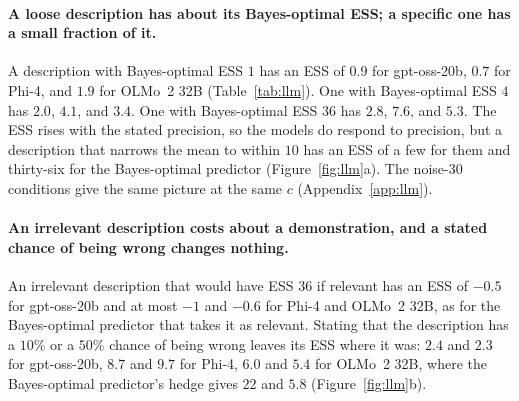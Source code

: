 \documentclass{article}
\begin{document}
\begin{table}[t]
\centering\small
\setlength{\tabcolsep}{2.4pt}
\caption{\textbf{The models rely on the stated value by a fixed amount, so a loose description has about its Bayes-optimal ESS and a specific one a small fraction of it.} Left: ESS of a description for each model against its Bayes-optimal ESS, the median over $n = 1$, $2$, and $4$ demonstrations shown ($\sigma = 60$, $2{,}000$ tasks; brackets, $95\%$ bootstrap intervals; negative: the description costs that many demonstrations; $\le$: one demonstration alone beats the description, so the ESS is at most the value shown), for a relevant description with Bayes-optimal ESS $1$, $4$, or $36$, an irrelevant one that would have ESS $36$, and the description with ESS $36$ with a stated $10\%$ or $50\%$ chance of being wrong. Right: the weight on the stated value with one demonstration shown, for the three relevant descriptions; the Bayes-optimal weight is $c/(c+n)$. The Bayes-optimal row knows only what the prompt says, takes a description as relevant unless a reliability is stated, and then hedges with that $p$.}
\label{tab:llm}
\vspace{3pt}

\end{table}

\paragraph{A loose description has about its Bayes-optimal ESS; a specific one has a small fraction of it.} A description with Bayes-optimal ESS $1$ has an ESS of $0.9$ for gpt-oss-20b, $0.7$ for Phi-4, and $1.9$ for OLMo~2 32B (Table~\ref{tab:llm}). One with Bayes-optimal ESS $4$ has $2.0$, $4.1$, and $3.4$. One with Bayes-optimal ESS $36$ has $2.8$, $7.6$, and $5.3$. The ESS rises with the stated precision, so the models do respond to precision, but a description that narrows the mean to within $10$ has an ESS of a few for them and thirty-six for the Bayes-optimal predictor (Figure~\ref{fig:llm}a). The noise-$30$ conditions give the same picture at the same $c$ (Appendix~\ref{app:llm}).

\paragraph{An irrelevant description costs about a demonstration, and a stated chance of being wrong changes nothing.} An irrelevant description that would have ESS $36$ if relevant has an ESS of $-0.5$ for gpt-oss-20b and at most $-1$ and $-0.6$ for Phi-4 and OLMo~2 32B, as for the Bayes-optimal predictor that takes it as relevant. Stating that the description has a $10\%$ or a $50\%$ chance of being wrong leaves its ESS where it was: $2.4$ and $2.3$ for gpt-oss-20b, $8.7$ and $9.7$ for Phi-4, $6.0$ and $5.4$ for OLMo~2 32B, where the Bayes-optimal predictor's hedge gives $22$ and $5.8$ (Figure~\ref{fig:llm}b).
\end{document}

